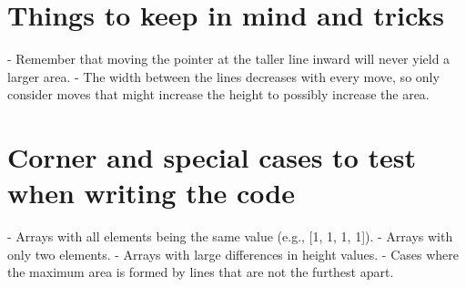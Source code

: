 \section*{Things to keep in mind and tricks}
- Remember that moving the pointer at the taller line inward will never yield a larger area.
- The width between the lines decreases with every move, so only consider moves that might increase the height to possibly increase the area.
  
\section*{Corner and special cases to test when writing the code}
- Arrays with all elements being the same value (e.g., [1, 1, 1, 1]).
- Arrays with only two elements.
- Arrays with large differences in height values.
- Cases where the maximum area is formed by lines that are not the furthest apart.